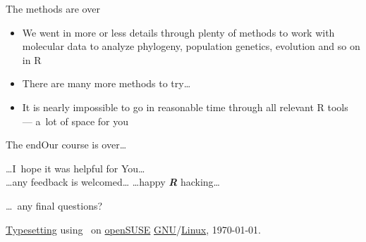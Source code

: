 \documentclass[compress, ucs, xelatex, 11pt, xcolor=svgnames, aspectratio=169,
	hyperref={
		bookmarks=true,
		unicode=true,
		colorlinks=true,
		pdftitle={Molecular data in R},
		plainpages=false,
		pdfauthor={Vojtech Zeisek},
		pdfsubject={Course about phylogeny and evolution in R},
		pdfcreator={XeLaTeX},
		pdfkeywords={R, evolution, phylogeny, molecular data},
		linkcolor=Crimson, %
		anchorcolor=Magenta, %
		citecolor=Magenta, %
		filecolor=Magenta, %
		menucolor=Magenta, %
		urlcolor=DodgerBlue, %
		pdftex},
	url={hyphens, lowtilde} %
	]{beamer}
\begin{document}
\begin{frame}{The methods are over}
	\begin{itemize}
		\item We went in more or less details through plenty of methods to work with molecular data to analyze phylogeny, population genetics, evolution and so on in R
		\item There are many more methods to try\ldots
		\item It is nearly impossible to go in reasonable time through all relevant R tools --- a~lot of space for you
	\end{itemize}
\end{frame}

\begin{frame}{The end}{Our course is over\ldots}
	\begin{center}
		\ldots I~hope it was helpful for You\ldots\\
		\vfill
		\ldots any feedback is welcomed\ldots
		\vfill
		\ldots happy \textbf{\textit{R}} hacking\ldots
		\vfill
	\end{center}
	\begin{flushright}
		\ldots~any final questions?
		\vfill
		\begin{tiny}
		\href{https://en.wikipedia.org/wiki/XeTeX}{Typesetting} using \XeLaTeX~on \href{https://www.opensuse.org/}{openSUSE} \href{https://en.wikipedia.org/wiki/GNU}{GNU}/\href{https://en.wikipedia.org/wiki/Linux}{Linux}, \today.
		\end{tiny}
	\end{flushright}
\end{frame}
\end{document}
